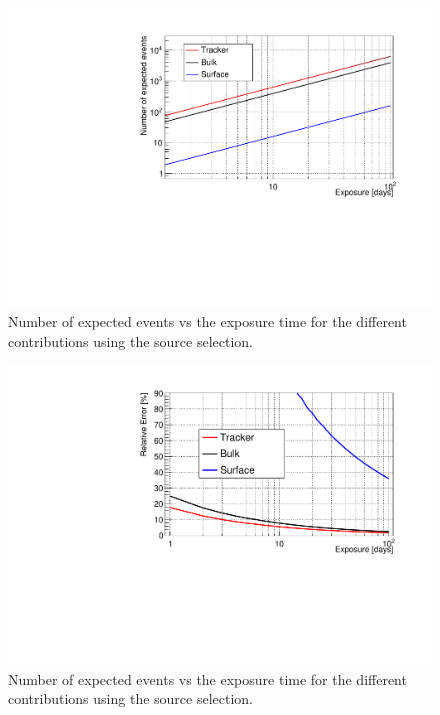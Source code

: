 \documentclass[main.tex]{subfiles}
\begin{document}
\begin{figure}[h!]
\begin{center}
\includegraphics[scale=0.6]{pictures/Chap5/nexpected_source_selection.pdf}
\caption{Number of expected events vs the exposure time for the different contributions using the source selection.}
\label{picture_number_of_expected_events_source_selection}
\end{center}
\end{figure}


\begin{figure}[h!]
\begin{center}
\includegraphics[scale=0.6]{pictures/Chap5/n_source_selection_last_results.pdf}
\caption{Number of expected events vs the exposure time for the different contributions using the source selection.}
\label{picture_relative_error_source_selection}
\end{center}
\end{figure}
\end{document}
